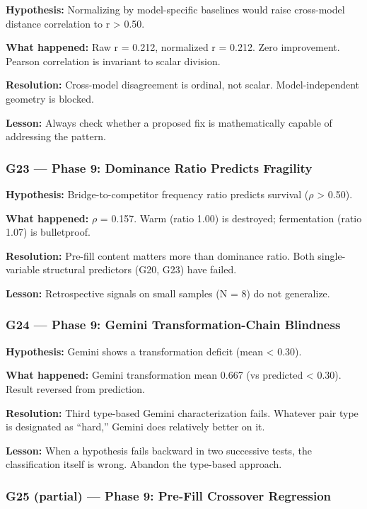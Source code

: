 \textbf{Hypothesis:} Normalizing by model-specific baselines would raise cross-model distance correlation to r \textgreater{} 0.50.

\textbf{What happened:} Raw r = 0.212, normalized r = 0.212. Zero improvement. Pearson correlation is invariant to scalar division.

\textbf{Resolution:} Cross-model disagreement is ordinal, not scalar. Model-independent geometry is blocked.

\textbf{Lesson:} Always check whether a proposed fix is mathematically capable of addressing the pattern.

\subsubsection{G23 --- Phase 9: Dominance Ratio Predicts Fragility}\label{g23-phase-9-dominance-ratio-predicts-fragility}

\textbf{Hypothesis:} Bridge-to-competitor frequency ratio predicts survival (\(\rho\) \textgreater{} 0.50).

\textbf{What happened:} \(\rho\) = 0.157. Warm (ratio 1.00) is destroyed; fermentation (ratio 1.07) is bulletproof.

\textbf{Resolution:} Pre-fill content matters more than dominance ratio. Both single-variable structural predictors (G20, G23) have failed.

\textbf{Lesson:} Retrospective signals on small samples (N = 8) do not generalize.

\subsubsection{G24 --- Phase 9: Gemini Transformation-Chain Blindness}\label{g24-phase-9-gemini-transformation-chain-blindness}

\textbf{Hypothesis:} Gemini shows a transformation deficit (mean \textless{} 0.30).

\textbf{What happened:} Gemini transformation mean 0.667 (vs predicted \textless{} 0.30). Result reversed from prediction.

\textbf{Resolution:} Third type-based Gemini characterization fails. Whatever pair type is designated as ``hard,'' Gemini does relatively better on it.

\textbf{Lesson:} When a hypothesis fails backward in two successive tests, the classification itself is wrong. Abandon the type-based approach.

\subsubsection{G25 (partial) --- Phase 9: Pre-Fill Crossover Regression}\label{g25-partial-phase-9-pre-fill-crossover-regression}

